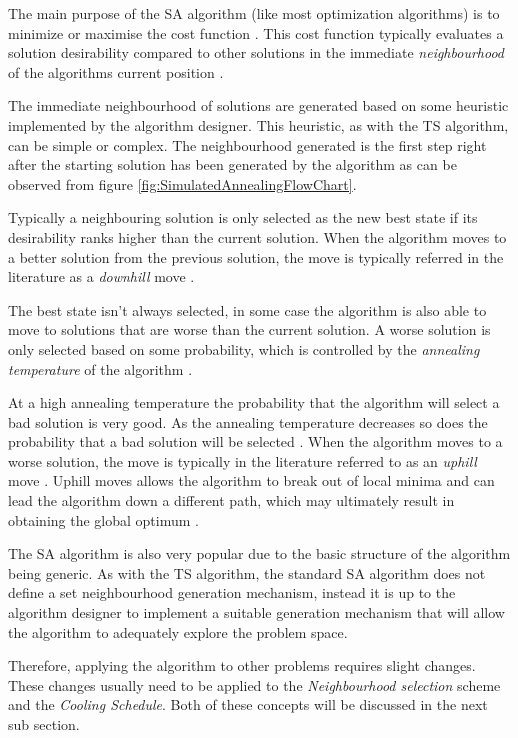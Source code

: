 The main purpose of the SA algorithm (like most optimization algorithms) is to minimize or maximise the cost function \cite{SASingleMultiObj}. This cost function typically evaluates a solution desirability compared to other solutions in the immediate \emph{neighbourhood} of the algorithms current position \cite{TheoPraticalSA}. 

The immediate neighbourhood of solutions are generated based on some heuristic implemented by the algorithm designer\cite{AIModernApproach}. This heuristic, as with the TS algorithm, can be simple or complex\cite{}. The neighbourhood generated is the first step right after the starting solution has been generated by the algorithm as can be observed from figure \ref{fig:SimulatedAnnealingFlowChart}.

Typically a neighbouring solution is only selected as the new best state if its desirability ranks higher than the current solution. When the algorithm moves to a better solution from the previous solution, the move is typically referred in the literature as a \emph{downhill} move \cite{CurveFittingSA}.

The best state isn't always selected, in some case the algorithm is also able to move to solutions that are worse than the current solution. A worse solution is only selected based on some probability, which is controlled by the \emph{annealing temperature} of the algorithm \cite{TheoPraticalSA}. 

At a high annealing temperature the probability that the algorithm will select a bad solution is very good. As the annealing temperature decreases so does the probability that a bad solution will be selected \cite{CurveFittingSA}. When the algorithm moves to a worse solution, the move is typically in the literature referred to as an \emph{uphill} move \cite{CurveFittingSA}. Uphill moves allows the algorithm to break out of local minima and can lead the algorithm down a different path, which may ultimately result in obtaining the global optimum \cite{SASingleMultiObj}. 

The SA algorithm is also very popular due to the basic structure of the algorithm being generic\cite{VariousCoolingSA}. As with the TS algorithm, the standard SA algorithm does not define a set neighbourhood generation mechanism, instead it is up to the algorithm designer to implement a suitable generation mechanism that will allow the algorithm to adequately explore the problem space\cite{VariousCoolingSA}. 

Therefore, applying the algorithm to other problems requires slight changes. These changes usually need to be applied to the \emph{Neighbourhood selection} scheme and the \emph{Cooling Schedule}\cite{VariousCoolingSA,DormRoomSA}. Both of these concepts will be discussed in the next sub section.

